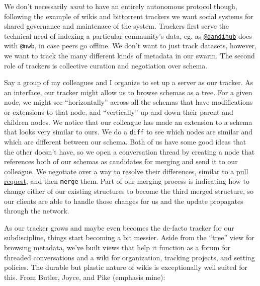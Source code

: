 We don't necessarily \emph{want} to have an entirely autonomous protocol
though, following the example of wikis and bittorrent trackers we want
social systems for shared governance and maintenace of the system.
Trackers first serve the technical need of indexing a particular
community's data, eg. as
\href{https://hub.dandiarchive.org}{\texttt{@dandihub}} does with
\texttt{@nwb}, in case peers go offline. We don't want to just track
datasets, however, we want to track the many different kinds of metadata
in our swarm. The second role of trackers is collective curation and
negotiation over schema.

Say a group of my colleagues and I organize to set up a server as our
tracker. As an interface, our tracker might allow us to browse schemas
as a tree. For a given node, we might see ``horizontally'' across all
the schemas that have modifications or extensions to that node, and
``vertically'' up and down their parent and children nodes. We notice
that our colleague has made an extension to a schema that looks very
similar to ours. We do a \texttt{diff} to see which nodes are similar
and which are different between our schema. Both of us have some good
ideas that the other doesn't have, so we open a conversation thread by
creating a node that references both of our schemas as candidates for
merging and send it to our colleague. We negotiate over a way to resolve
their differences, similar to a
\href{https://docs.github.com/en/pull-requests/collaborating-with-pull-requests/proposing-changes-to-your-work-with-pull-requests/about-pull-requests}{pull
request}, and then \texttt{merge} them. Part of our merging process is
indicating how to change either of our existing structures to become the
third merged structure, so our clients are able to handle those changes
for us and the update propagates through the network.

As our tracker grows and maybe even becomes the de-facto tracker for our
subdiscipline, things start becoming a bit messier. Aside from the
``tree'' view for browsing metadata, we've built views that help it
function as a forum for threaded conversations and a wiki for
organization, tracking projects, and setting policies. The durable but
plastic nature of wikis is exceptionally well suited for this. From
Butler, Joyce, and Pike (emphasis mine):

